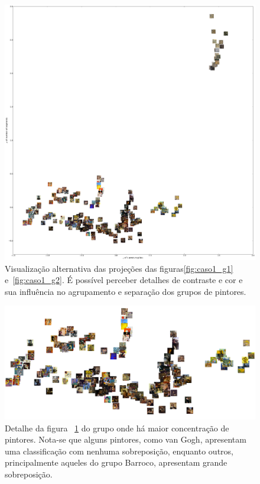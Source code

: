 \begin{figure}[h!]
  \begin{center}
     \caption{Visualização alternativa das projeções das figuras\ref{fig:caso1_g1}
    e~\ref{fig:caso1_g2}. É possível perceber detalhes de contraste e cor e sua
    influência no agrupamento e separação dos grupos de pintores.}
  \label{fig:alternativa}
    \includegraphics[width=\textwidth]{figs/caso1_g1_alternativo.pdf}
   \fonteminha
  \end{center}
\end{figure}

\begin{figure}[h!]
  \begin{center}
  \caption{Detalhe da figura ~\ref{fig:alternativa} do grupo onde há maior
    concentração de pintores. Nota-se que alguns pintores, como van Gogh,
    apresentam uma classificação com nenhuma sobreposição, enquanto outros,
    principalmente aqueles do grupo Barroco, apresentam grande sobreposição.}
  \label{fig:alternativa1}
    \includegraphics[width=\textwidth]{figs/detalhe1.pdf}
   \fonteminha
  \end{center}
\end{figure}

